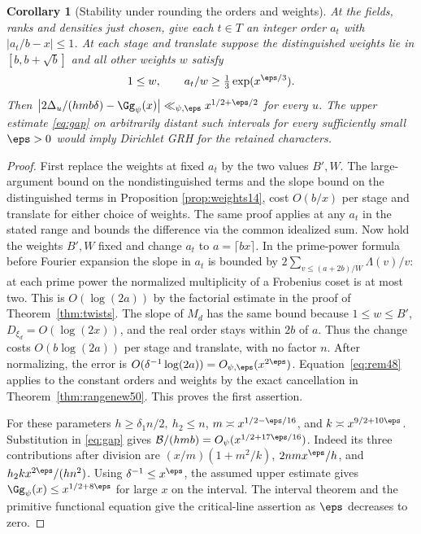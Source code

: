 \documentclass[a4paper,11pt]{article}
\newtheorem{corollary}[proposition]{Corollary}
\theoremstyle{definition}
\theoremstyle{remark}
\numberwithin{equation}{section}
\begin{document}
\begin{corollary}[Stability under rounding the orders and weights]\label{cor:actual50}
At the fields, ranks and densities just chosen, give each \(t\in T\)
an integer order \(a_t\) with \(|a_t/b-x|\le1\). At each stage and
translate suppose the distinguished weights lie in \([b,b+\sqrt b]\)
and all other weights \(w\) satisfy
\[
           1\le w,\qquad a_t/w\ge\tfrac13\exp(x^{\eps/3}).
\]
Then \(\left|2\Delta_u/(hm b\delta)-\Gg_\psi(x)\right|
\ll_{\psi,\eps}x^{1/2+\eps/2}\) for every \(u\).
The upper estimate \eqref{eq:gap} on arbitrarily distant such intervals
for every sufficiently small \(\eps>0\) would imply Dirichlet GRH for
the retained characters.
\end{corollary}
\begin{proof}
First replace the weights at fixed \(a_t\) by the two values \(B',W\).
The large-argument bound on the nondistinguished terms and the slope
bound on the distinguished terms in Proposition \ref{prop:weights14}, cost
\(O(b/x)\) per stage and translate for either choice of weights. The
same proof applies at any \(a_t\) in the stated range and bounds the
difference via the common idealized sum. Now hold the weights \(B',W\)
fixed and change \(a_t\) to \(a=\lceil bx\rceil\). In the prime-power
formula before Fourier expansion the slope in \(a_t\) is bounded by
\(2\sum_{v\le (a+2b)/W}\Lambda(v)/v\): at each prime power the
normalized multiplicity of a Frobenius coset is at most two. This is
\(O(\log(2a))\) by the factorial estimate in the proof of
Theorem~\ref{thm:twists}. The slope of \(M_d\) has the same bound
because \(1\le w\le B'\), \(D_{\xi_d}=O(\log(2x))\), and the real
order stays within \(2b\) of \(a\). Thus the change costs
\(O(b\log(2a))\) per stage and translate, with no factor \(n\).
After normalizing, the error is
\(O(\delta^{-1}\log(2a))=O_{\psi,\eps}(x^{2\eps})\).
Equation~\eqref{eq:rem48} applies to the constant orders and weights
by the exact cancellation in Theorem~\ref{thm:rangenew50}. This
proves the first assertion.

For these parameters \(h\ge\delta_1 n/2,\ h_2\le n\),
\(m\asymp x^{1/2-\eps/16}\), and \(k\asymp x^{9/2+10\eps}\).
Substitution in \eqref{eq:gap} gives
\(\mathcal B/(hmb)=O_\psi(x^{1/2+17\eps/16})\).
Indeed its three contributions after division are
\((x/m)(1+m^2/k)\), \(2nm x^\eps/h\), and
\(h_2 k x^{2\eps}/(h n^2)\).
Using \(\delta^{-1}\le x^\eps\), the assumed upper estimate gives
\(\Gg_\psi(x)\le x^{1/2+8\eps}\) for large \(x\) on the interval.
The interval theorem and the primitive functional equation give the
critical-line assertion as \(\eps\) decreases to zero.
\end{proof}
\end{document}
